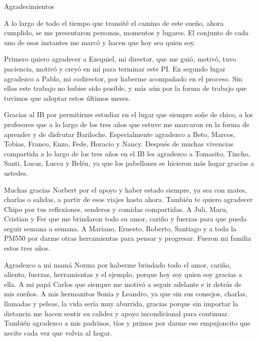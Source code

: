 \documentclass[12pt,papel,oneside]{ibtesis}
\begin{document}
\begin{biblio}

\end{biblio}


\begin{postliminary}

\listoffigures                  %

\listoftables                   %






\begin{seccion}{Agradecimientos}
\begin{footnotesize}	
	
A lo largo de todo el tiempo que transité el camino de este sueño, ahora cumplido, se me presentaron personas, momentos y lugares. El conjunto de cada uno de esos instantes me marcó y hacen que hoy sea quien soy.

Primero quiero agradecer a Ezequiel, mi director, que me guió, motivó, tuvo paciencia, motivó y creyó en mí para terminar este PI. En segundo lugar agradezco a Pablo, mi codirector, por haberme acompañado en el proceso. Sin ellos este trabajo no hubise sido posible, y más aún por la forma de trabajo que tuvimos que adoptar estos últimos meses.

Gracias al IB por permitirme estudiar en el lugar que siempre soñe de chico, a los profesores que a lo largo de los tres años que estuve me marcaron en la forma de aprender y de disfrutar Bariloche. Especialmente agradezco a Beto, Marcos, Tobias, Franco, Enzo, Fede, Horacio y Nancy. Después de muchas vivencias compartida a lo largo de los tres años en el IB les agradezco a Tomasito, Tincho, Santi, Lucas, Lucca y Belén, ya que los pabellones se hicieron más hogar gracias a ustedes. 

Muchas gracias Norbert por el apoyo y haber estado siempre, ya sea con mates, charlas o salidas, a partir de esos viajes hasta ahora. También te quiero agradecer Chipo por tus reflexiones, senderos y comidas compartidas. A Juli, Maru, Cristian y Fer que me brindaron todo su amor, cariño y fuerzas para que pueda seguir semana a semana. A Mariano, Ernesto, Roberto, Santiago y a toda la PM550 por darme otras herramientas para pensar y progresar. Fueron mi familia estos tres años.

Agradezco a mi mamá Norma por haberme brindado todo el amor, cariño, aliento, fuerzas, herramientas y el ejemplo, porque  hoy soy quien soy gracias a ella. A mi papá Carlos que siempre me motivó a seguir adelante e ir detrás de mis sueños. A mis hermanitos Sonia y Leandro, ya que sin sus consejos, charlas, llamadas y peleas, la vida sería muy aburrida, gracias porque sin importar la distancia me hacen sentir su calidez y apoyo incondicional para continuar. También agradezco a mis padrinos, tíos y primos por darme ese empujoncito que necite cada vez que volvia al hogar.


\end{footnotesize}
\end{seccion}
\end{postliminary}
\end{document}
